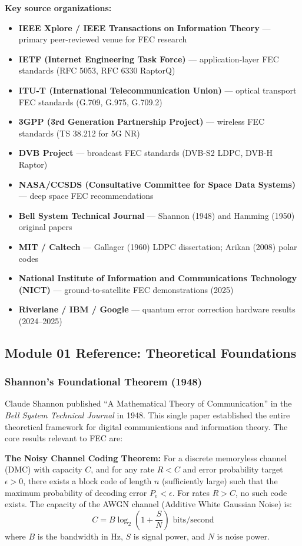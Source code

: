 \documentclass[11pt,letterpaper]{article}
\begin{document}
\textbf{Key source organizations:}
\begin{itemize}[leftmargin=*]
  \item \textbf{IEEE Xplore / IEEE Transactions on Information Theory} --- primary peer-reviewed venue for FEC research
  \item \textbf{IETF (Internet Engineering Task Force)} --- application-layer FEC standards (RFC 5053, RFC 6330 RaptorQ)
  \item \textbf{ITU-T (International Telecommunication Union)} --- optical transport FEC standards (G.709, G.975, G.709.2)
  \item \textbf{3GPP (3rd Generation Partnership Project)} --- wireless FEC standards (TS 38.212 for 5G NR)
  \item \textbf{DVB Project} --- broadcast FEC standards (DVB-S2 LDPC, DVB-H Raptor)
  \item \textbf{NASA/CCSDS (Consultative Committee for Space Data Systems)} --- deep space FEC recommendations
  \item \textbf{Bell System Technical Journal} --- Shannon (1948) and Hamming (1950) original papers
  \item \textbf{MIT / Caltech} --- Gallager (1960) LDPC dissertation; Arikan (2008) polar codes
  \item \textbf{National Institute of Information and Communications Technology (NICT)} --- ground-to-satellite FEC demonstrations (2025)
  \item \textbf{Riverlane / IBM / Google} --- quantum error correction hardware results (2024--2025)
\end{itemize}

\subsection{Module 01 Reference: Theoretical Foundations}

\subsubsection{Shannon's Foundational Theorem (1948)}

Claude Shannon published ``A Mathematical Theory of Communication'' in the \textit{Bell System Technical Journal} in 1948. This single paper established the entire theoretical framework for digital communications and information theory. The core results relevant to FEC are:

\textbf{The Noisy Channel Coding Theorem:} For a discrete memoryless channel (DMC) with capacity $C$, and for any rate $R < C$ and error probability target $\epsilon > 0$, there exists a block code of length $n$ (sufficiently large) such that the maximum probability of decoding error $P_e < \epsilon$. For rates $R > C$, no such code exists. The capacity of the AWGN channel (Additive White Gaussian Noise) is:
$$C = B \log_2\!\left(1 + \frac{S}{N}\right) \text{ bits/second}$$
where $B$ is the bandwidth in Hz, $S$ is signal power, and $N$ is noise power.
\end{document}
